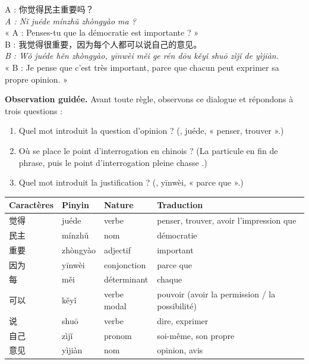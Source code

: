\documentclass[11pt]{article}
\newcommand{\zh}[1]{\ifmmode\text{#1}\else{#1}\fi}
\begin{document}
\begin{textebox}
A : 你觉得民主重要吗？\\
\emph{A : Nǐ juéde mínzhǔ zhòngyào ma ?}\\
« A : Penses-tu que la démocratie est importante ? »\\[0.4em]
B : 我觉得很重要，因为每个人都可以说自己的意见。\\
\emph{B : Wǒ juéde hěn zhòngyào, yīnwèi měi ge rén dōu kěyǐ shuō zìjǐ de yìjiàn.}\\
« B : Je pense que c'est très important, parce que chacun peut exprimer sa propre opinion. »
\end{textebox}

\textbf{Observation guidée.} Avant toute règle, observons ce dialogue et répondons à trois questions :
\begin{enumerate}
\item Quel mot introduit la question d'opinion ? (\zh{觉得}, juéde, « penser, trouver ».)
\item Où se place le point d'interrogation en chinois ? (La particule \zh{吗} en fin de phrase, puis le point d'interrogation pleine chasse \zh{？}.)
\item Quel mot introduit la justification ? (\zh{因为}, yīnwèi, « parce que ».)
\end{enumerate}

\begin{center}
\begin{tabularx}{\linewidth}{|X|X|X|X|}
\hline
\rowcolor{popblueL} Caractères & Pinyin & Nature & Traduction \\
\hline
觉得 & juéde & verbe & penser, trouver, avoir l'impression que \\
\hline
民主 & mínzhǔ & nom & démocratie \\
\hline
重要 & zhòngyào & adjectif & important \\
\hline
因为 & yīnwèi & conjonction & parce que \\
\hline
每 & měi & déterminant & chaque \\
\hline
可以 & kěyǐ & verbe modal & pouvoir (avoir la permission / la possibilité) \\
\hline
说 & shuō & verbe & dire, exprimer \\
\hline
自己 & zìjǐ & pronom & soi-même, son propre \\
\hline
意见 & yìjiàn & nom & opinion, avis \\
\hline
\end{tabularx}
\end{center}
\end{document}
